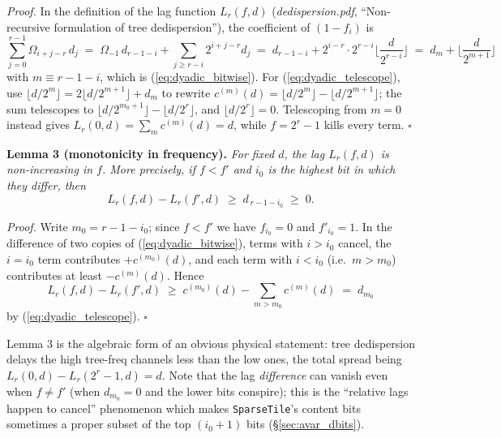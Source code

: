 \documentclass{article}
\numberwithin{equation}{section}   %
\newcommand{\ddnotes}[1]{{\em dedispersion.pdf}, ``#1''}
\begin{document}
\medskip
\par\noindent
{\em Proof.} In the definition of the lag function $L_r(f,d)$ (\ddnotes{Non-recursive
formulation of tree dedispersion}), the coefficient of $(1-f_i)$ is
\begin{equation}
\sum_{j=0}^{r-1} \Omega_{i+j-r} \, d_j
 \;=\; \Omega_{-1} \, d_{r-1-i} + \sum_{j \ge r-i} 2^{i+j-r} d_j
 \;=\; d_{r-1-i} + 2^{i-r} \cdot 2^{r-i} \Big\lfloor \frac{d}{2^{r-i}} \Big\rfloor
 \;=\; d_m + \Big\lfloor \frac{d}{2^{m+1}} \Big\rfloor
\end{equation}
with $m \equiv r-1-i$, which is (\ref{eq:dyadic_bitwise}). For
(\ref{eq:dyadic_telescope}), use $\lfloor d/2^m \rfloor = 2 \lfloor d/2^{m+1} \rfloor + d_m$
to rewrite $c^{(m)}(d) = \lfloor d/2^m \rfloor - \lfloor d/2^{m+1} \rfloor$; the sum
telescopes to $\lfloor d/2^{m_0+1} \rfloor - \lfloor d/2^r \rfloor$, and
$\lfloor d/2^r \rfloor = 0$. Telescoping from $m=0$ instead gives
$L_r(0,d) = \sum_m c^{(m)}(d) = d$, while $f = 2^r-1$ kills every term. $\square$

\medskip
\par\noindent
{\bf Lemma 3 (monotonicity in frequency).}
{\em For fixed $d$, the lag $L_r(f,d)$ is non-increasing in $f$. More precisely, if $f<f'$
and $i_0$ is the highest bit in which they differ, then}
\begin{equation}
L_r(f,d) - L_r(f',d) \;\ge\; d_{\,r-1-i_0} \;\ge\; 0.
\label{eq:dyadic_monotone}
\end{equation}

\medskip
\par\noindent
{\em Proof.} Write $m_0 = r-1-i_0$; since $f<f'$ we have $f_{i_0}=0$ and $f'_{i_0}=1$. In
the difference of two copies of (\ref{eq:dyadic_bitwise}), terms with $i>i_0$ cancel, the
$i=i_0$ term contributes $+c^{(m_0)}(d)$, and each term with $i<i_0$ (i.e.\ $m>m_0$)
contributes at least $-c^{(m)}(d)$. Hence
\begin{equation}
L_r(f,d) - L_r(f',d) \;\ge\; c^{(m_0)}(d) - \sum_{m>m_0} c^{(m)}(d) \;=\; d_{m_0}
\end{equation}
by (\ref{eq:dyadic_telescope}). $\square$

\medskip
\par\noindent
Lemma 3 is the algebraic form of an obvious physical statement: tree dedispersion delays the
high tree-freq channels less than the low ones, the total spread being
$L_r(0,d) - L_r(2^r-1,d) = d$. Note that the lag {\em difference} can vanish even when
$f \ne f'$ (when $d_{m_0}=0$ and the lower bits conspire); this is the ``relative lags happen
to cancel'' phenomenon which makes {\tt SparseTile}'s content bits sometimes a proper subset
of the top $(i_0+1)$ bits (\S\ref{sec:avar_dbits}).
\end{document}
